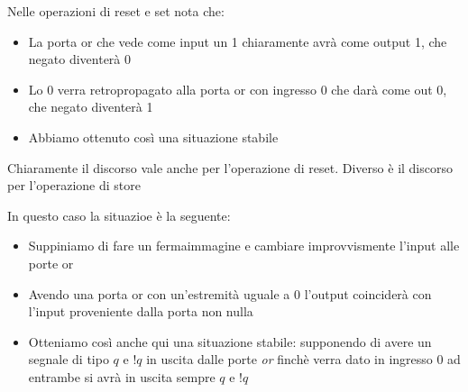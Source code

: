 Nelle operazioni di reset e set nota che:
\begin{itemize}
	\item La porta or che vede come input un 1 chiaramente avrà come output 1, che negato diventerà 0
	\item Lo 0 verra retropropagato alla porta or con ingresso 0 che darà come out 0, che negato diventerà 1
	\item Abbiamo ottenuto così una situazione stabile
\end{itemize}
Chiaramente il discorso vale anche per l'operazione di reset. Diverso è il discorso per l'operazione di store
\begin{center}
\end{center}
\vskip3mm
In questo caso la situazioe è la seguente:
\begin{itemize}
	\item Suppiniamo di fare un fermaimmagine e cambiare improvvismente l'input alle porte or
	\item Avendo una porta or con un'estremità uguale a 0 l'output coinciderà con l'input proveniente dalla porta non nulla
	\item Otteniamo così anche qui una situazione stabile: supponendo di avere un segnale di tipo $ q $ e $ !q $ in uscita dalle porte \textit{or} finchè verra dato in ingresso 0 ad entrambe si avrà in uscita sempre $ q $ e $ !q $
\end{itemize}
